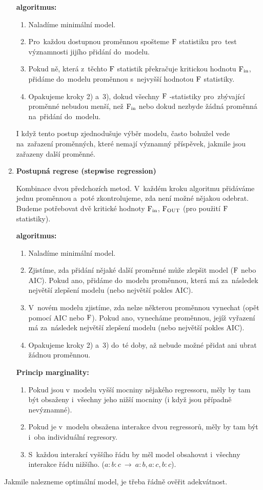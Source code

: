 \begin{enumerate}[1)]
\textbf{algoritmus:}\begin{enumerate}[	1)]
	\item Naladíme minimální model.
	\item Pro~každou dostupnou proměnnou spošteme $\mathrm{F}$ statistiku pro~test významnosti jijího přidání do~modelu.
	\item Pokud ně, která z~těchto $\mathrm{F}$ statistik překračuje kritickou hodnotu $\mathrm{F}_\mathrm{in}$, přidáme do~modelu proměnnou s~nejvyšší hodnotou $\mathrm{F}$ statistiky.
	\item Opakujeme kroky 2) a~3), dokud všechny $\mathrm{F}$ -statistiky pro~zbývající proměnné nebudou menší, než $\mathrm{F}_\mathrm{in}$ nebo dokud nezbyde žádná proměnná na~přidání do~modelu.
\end{enumerate}
\begin{remark}
	I když tento postup zjednodušuje výběr modelu, často bohužel vede na~zařazení proměnných, které nemají významný příspěvek, jakmile jsou zařazeny další proměnné.
\end{remark}

\item
\textbf{Postupná regrese (stepwise regression)}

Kombinace dvou předchozích metod. V~každém kroku algoritmu přidáváme jednu proměnnou a~poté zkontrolujeme, zda není možné nějakou odebrat. Budeme potřebovat  dvě kritické hodnoty $\mathrm{F}_\mathrm{in}$, $\mathrm{F}_\mathrm{OUT}$ (pro použití $\mathrm{F}$ statistiky).

\textbf{algoritmus:}\begin{enumerate}[	1)]
	\item Naladíme minimální model.
	\item Zjistíme, zda přidání nějaké další proměnné může zlepšit model ($\mathrm{F}$ nebo AIC). Pokud ano, přidáme do~modelu proměnnou, která má za~následek největší zlepšení modelu (nebo největší pokles AIC).
	\item V~novém modelu zjistíme, zda nelze některou proměnnou vynechat (opět pomocí AIC nebo $\mathrm{F}$). Pokud ano, vynecháme proměnnou, jejíž vyřazení má za~následek největší zlepšení modelu (nebo největší pokles AIC).
	\item Opakujeme kroky 2) a~3) do~té doby, až nebude možné přidat ani ubrat žádnou proměnnou.
\end{enumerate}

\textbf{Princip marginality:}
\begin{enumerate}[	1)]
	\item Pokud jsou v~modelu vyšší mocniny nějakého regressoru, měly by tam být obsaženy i~všechny jeho nižší mocniny (i když jsou případně nevýznamné).
	\item Pokud je v~modelu obsažena interakce dvou regressorů, měly by tam být i~oba individuální regresory.
	\item S~každou interakcí vyššího řádu by měl model obsahovat i~všechny interakce řádu nižšího. ($a:b:c~\to~a:b,a:c,b:c$).
\end{enumerate}
\end{enumerate}

\begin{remark}
	Jakmile nalezneme optimální model, je třeba řádně ověřit adekvátnost.
\end{remark}